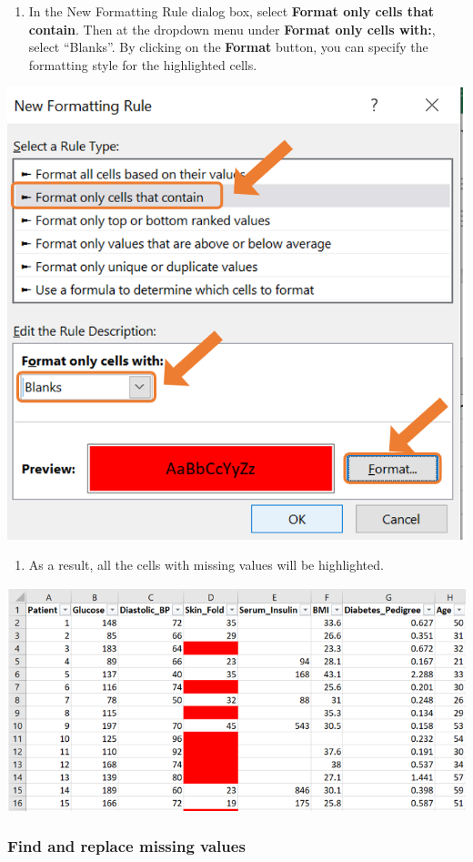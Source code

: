 \documentclass[
]{book}
\providecommand{\tightlist}{%
  \setlength{\itemsep}{0pt}\setlength{\parskip}{0pt}}
\begin{document}
\newpage

\begin{enumerate}
\def\labelenumi{\arabic{enumi}.}
\setcounter{enumi}{1}
\tightlist
\item
  In the New Formatting Rule dialog box, select \textbf{Format only cells that contain}. Then at the dropdown menu under \textbf{Format only cells with:}, select ``Blanks''. By clicking on the \textbf{Format} button, you can specify the formatting style for the highlighted cells.
\end{enumerate}

\begin{center}\includegraphics[width=0.4\linewidth]{Figures/missing_2_2} \end{center}

\begin{enumerate}
\def\labelenumi{\arabic{enumi}.}
\setcounter{enumi}{2}
\tightlist
\item
  As a result, all the cells with missing values will be highlighted.
\end{enumerate}

\begin{center}\includegraphics[width=0.8\linewidth]{Figures/missing_2_3} \end{center}

\subsubsection*{Find and replace missing values}\label{find-and-replace-missing-values}
\end{document}
